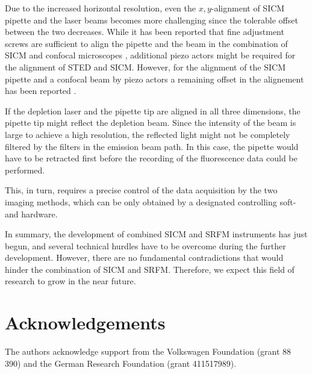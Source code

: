 Due to the increased horizontal resolution, even the $x,y$-alignment of SICM
pipette and the laser beams becomes more challenging since the tolerable
offset between the two decreases. While it has been reported that fine
adjustment screws are sufficient to align the pipette and the beam in the
combination of SICM and confocal microscopes \cite{Gorelik2002a,
  Shevchuk2008,Novak2014}, additional piezo actors might be required for the
alignment of STED and SICM. However, for the alignment of the SICM pipette and a
confocal beam by piezo actors a remaining offset in the alignement has been
reported \cite{Bednarska2020}. 

If the depletion laser and the pipette tip are aligned in all three
dimensions, the pipette tip might reflect the depletion beam. Since the
intensity of the beam is large to achieve a high resolution, the reflected
light might not be completely filtered by the filters in the emission beam
path. In this case, the pipette would have to be retracted first before the
recording of the fluorescence data could be performed.

This, in turn, requires a precise control of the data acquisition by the two
imaging methods, which can be only obtained by a designated controlling soft-
and hardware.

In summary, the development of combined SICM and SRFM instruments has just
begun, and several technical hurdles have to be overcome during the
further development. However, there are no fundamental contradictions that
would hinder the combination of SICM and SRFM. Therefore, we expect this field
of research to grow in the near future.     

\section{Acknowledgements}
The authors acknowledge support from the Volkswagen
Foundation (grant 88 390) and the German Research Foundation (grant
411517989). 
